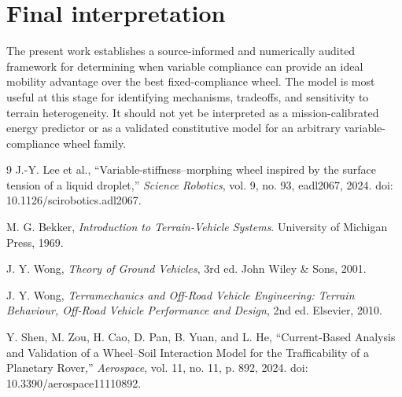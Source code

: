 \documentclass[11pt]{article}
\begin{document}
\section{Final interpretation}

The present work establishes a source-informed and numerically audited framework for determining when variable compliance can provide an ideal mobility advantage over the best fixed-compliance wheel. The model is most useful at this stage for identifying mechanisms, tradeoffs, and sensitivity to terrain heterogeneity. It should not yet be interpreted as a mission-calibrated energy predictor or as a validated constitutive model for an arbitrary variable-compliance wheel family.

\begin{thebibliography}{9}
J.-Y. Lee et al., ``Variable-stiffness--morphing wheel inspired by the surface tension of a liquid droplet,'' \emph{Science Robotics}, vol. 9, no. 93, eadl2067, 2024. doi: 10.1126/scirobotics.adl2067.

M. G. Bekker, \emph{Introduction to Terrain-Vehicle Systems}. University of Michigan Press, 1969.

J. Y. Wong, \emph{Theory of Ground Vehicles}, 3rd ed. John Wiley \& Sons, 2001.

J. Y. Wong, \emph{Terramechanics and Off-Road Vehicle Engineering: Terrain Behaviour, Off-Road Vehicle Performance and Design}, 2nd ed. Elsevier, 2010.

Y. Shen, M. Zou, H. Cao, D. Pan, B. Yuan, and L. He, ``Current-Based Analysis and Validation of a Wheel--Soil Interaction Model for the Trafficability of a Planetary Rover,'' \emph{Aerospace}, vol. 11, no. 11, p. 892, 2024. doi: 10.3390/aerospace11110892.
\end{thebibliography}
\end{document}
